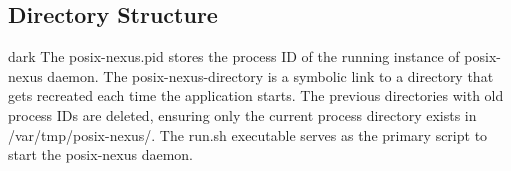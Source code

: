 \subsection{Directory Structure}

\begin{baseBoxOne}{}{dark}
    The posix-nexus.pid stores the process ID of the running instance of posix-nexus daemon.
    The posix-nexus-directory is a symbolic link to a directory that gets recreated each time the application starts.
    The previous directories with old process IDs are deleted, ensuring only the current process directory exists in /var/tmp/posix-nexus/.
    The run.sh executable serves as the primary script to start the posix-nexus daemon.
\end{baseBoxOne}

